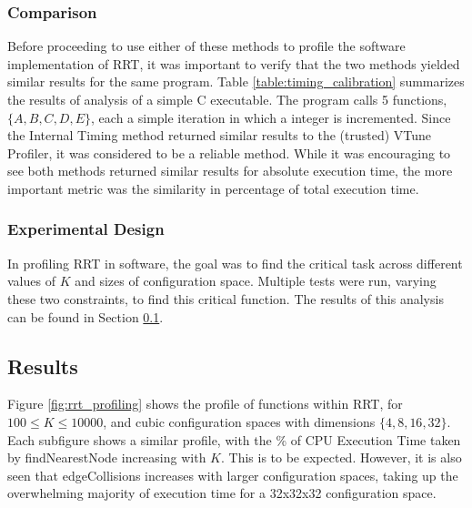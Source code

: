 
    \subsubsection*{Comparison}
        Before proceeding to use either of these methods to profile the software implementation of \gls{RRT}, it was important to verify that the two methods yielded similar results for the same program. Table \ref{table:timing_calibration} summarizes the results of analysis of a simple C executable. The program calls 5 functions, $\{A, B, C, D, E\}$, each a simple iteration in which a integer is incremented. Since the Internal Timing method returned similar results to the (trusted) VTune Profiler, it was considered to be a reliable method. While it was encouraging to see both methods returned similar results for absolute execution time, the more important metric was the similarity in percentage of total execution time.

        

    \subsubsection*{Experimental Design}
        In profiling \gls{RRT} in software, the goal was to find the critical task across different values of $K$ and sizes of \gls{configuration} space. Multiple tests were run, varying these two constraints, to find this critical function. The results of this analysis can be found in Section \ref{section:rrt_analysis_results}.

\subsection{Results}
\label{section:rrt_analysis_results}
    Figure \ref{fig:rrt_profiling} shows the profile of functions within \gls{RRT}, for $100 \leq K \leq 10000$, and cubic \gls{configuration} spaces with dimensions $\{4, 8, 16, 32\}$. Each subfigure shows a similar profile, with the \% of CPU Execution Time taken by findNearestNode increasing with $K$. This is to be expected. However, it is also seen that edgeCollisions increases with larger \gls{configuration} spaces, taking up the overwhelming majority of execution time for a 32x32x32 \gls{configuration} space.
    
    \newpage
    

